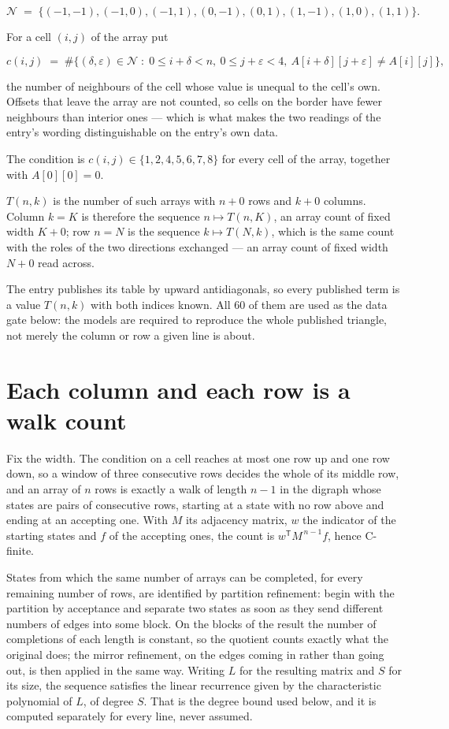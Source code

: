 \documentclass[11pt]{article}
\theoremstyle{definition}
\begin{document}
\[\mathcal{N} \;=\; \{(-1,-1), (-1,0), (-1,1), (0,-1), (0,1), (1,-1), (1,0), (1,1)\}.\]

For a cell $(i,j)$ of the array put

\[c(i,j) \;=\; \#\bigl\{(\delta,\varepsilon)\in\mathcal{N} \;:\; 0\le i+\delta<n,\ 0\le j+\varepsilon<4,\ A[i+\delta][j+\varepsilon] \neq A[i][j]\bigr\},\]

the number of neighbours of the cell whose value is unequal to the cell's own. Offsets that leave the array are not counted, so cells on the border have fewer neighbours than interior ones --- which is what makes the two readings of the entry's wording distinguishable on the entry's own data.

The condition is $c(i,j) \in \{1, 2, 4, 5, 6, 7, 8\}$ for every cell of the array, together with $A[0][0]=0$.

$T(n,k)$ is the number of such arrays with $n + 0$ rows and $k + 0$ columns. Column $k = K$ is therefore the sequence $n \mapsto T(n,K)$, an array count of fixed width $K + 0$; row $n = N$ is the sequence $k \mapsto T(N,k)$, which is the same count with the roles of the two directions exchanged --- an array count of fixed width $N + 0$ read across.

The entry publishes its table by upward antidiagonals, so every published term is a value $T(n,k)$ with both indices known. All 60 of them are used as the data gate below: the models are required to reproduce the whole published triangle, not merely the column or row a given line is about.

\section{Each column and each row is a walk count}

Fix the width. The condition on a cell reaches at most one row up and one row down, so a window of three consecutive rows decides the whole of its middle row, and an array of $n$ rows is exactly a walk of length $n-1$ in the digraph whose states are pairs of consecutive rows, starting at a state with no row above and ending at an accepting one. With $M$ its adjacency matrix, $w$ the indicator of the starting states and $f$ of the accepting ones, the count is $w^{\mathsf T}M^{\,n-1}f$, hence C-finite.

States from which the same number of arrays can be completed, for every remaining number of rows, are identified by partition refinement: begin with the partition by acceptance and separate two states as soon as they send different numbers of edges into some block. On the blocks of the result the number of completions of each length is constant, so the quotient counts exactly what the original does; the mirror refinement, on the edges coming in rather than going out, is then applied in the same way. Writing $L$ for the resulting matrix and $S$ for its size, the sequence satisfies the linear recurrence given by the characteristic polynomial of $L$, of degree $S$. That is the degree bound used below, and it is computed separately for every line, never assumed.
\end{document}

